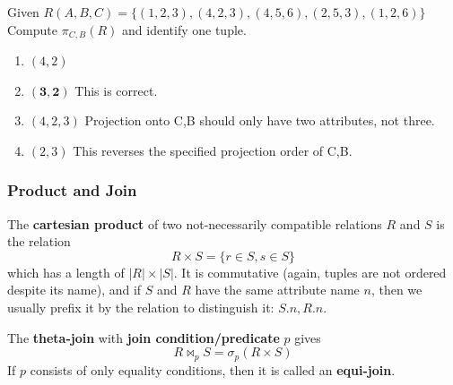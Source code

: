 \documentclass{article}
\begin{document}
      \begin{example}
        Given $R(A,B,C) = \{(1,2,3), (4,2,3), (4,5,6), (2,5,3), (1,2,6)\}$\\
        Compute $\pi_{C,B}(R)$ and identify one tuple.

        \begin{enumerate}
          \item $(4,2)$ 
          \item $\mathbf{(3,2)}$ This is correct. 
          \item $(4,2,3)$ Projection onto C,B should only have two attributes, not three.
          \item $(2,3)$ This reverses the specified projection order of C,B.
        \end{enumerate}
      \end{example}

    \subsubsection{Product and Join}

      \begin{definition}
        The \textbf{cartesian product} of two not-necessarily compatible relations $R$ and $S$ is the relation 
        \begin{equation}
          R \times S = \{r \in S, s \in S\} 
        \end{equation}
        which has a length of $|R| \times |S|$. It is commutative (again, tuples are not ordered despite its name), and if $S$ and $R$ have the same attribute name $n$, then we usually prefix it by the relation to distinguish it: $S.n, R.n$. 
      \end{definition}

      \begin{definition}
        The \textbf{theta-join} with \textbf{join condition/predicate} $p$ gives 
        \begin{equation}
          R \bowtie_p S = \sigma_p (R \times S)
        \end{equation}
        If $p$ consists of only equality conditions, then it is called an \textbf{equi-join}. 
      \end{definition}
\end{document}
